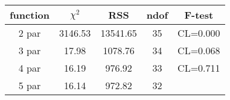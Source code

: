\begin{tabular}{c|c|c|c|c}
function & $\chi^2$ & RSS & ndof & F-test \\
\hline
2 par & 3146.53 & 13541.65 & 35 & CL=0.000 \\
3 par & 17.98 & 1078.76 & 34 & CL=0.068 \\
4 par & 16.19 & 976.92 & 33 & CL=0.711 \\
5 par & 16.14 & 972.82 & 32 & \\
\hline
\end{tabular}